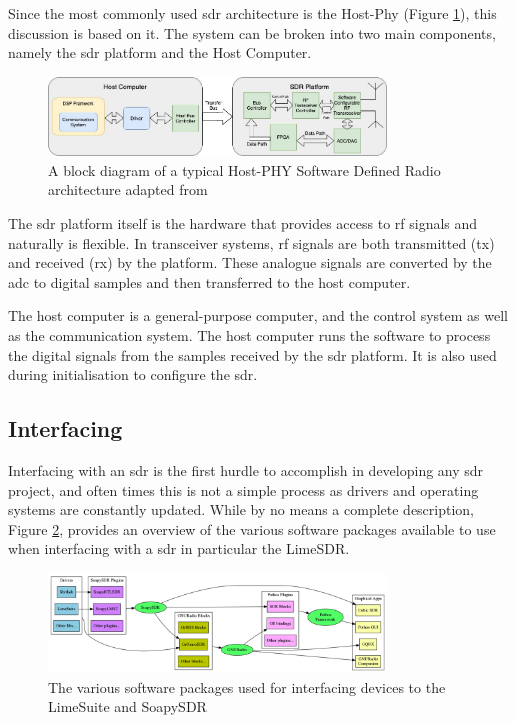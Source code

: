 \documentclass[class=report,11pt,crop=false]{standalone}
\begin{document}
Since the most commonly used \gls{sdr} architecture is the Host-Phy (Figure \ref{fig:hostphy}), this discussion is based on it. The system can be broken into two main components, namely the \gls{sdr} platform and the Host Computer. 

\begin{figure}[h]
    \centering
    \includegraphics[width=0.8\textwidth]{Images/diagrams/SDR.jpg}
    \caption{A block diagram of a typical Host-PHY Software Defined Radio architecture adapted from \cite{sdr-arch}}
    \label{fig:hostphy}
\end{figure}

The \gls{sdr} platform itself is the hardware that provides access to \gls{rf} signals and naturally is flexible. In transceiver systems, \gls{rf} signals are both transmitted (\gls{tx}) and received (\gls{rx}) by the platform. These analogue signals are converted by the \gls{adc} to digital samples and then transferred to the host computer. 

The host computer is a general-purpose computer, and the control system as well as the communication system. The host computer runs the software to process the digital signals from the samples received by the \gls{sdr} platform. It is also used during initialisation to configure the \gls{sdr}.

\subsection{Interfacing}
Interfacing with an \gls{sdr} is the first hurdle to accomplish in developing any \gls{sdr} project, and often times this is not a simple process as drivers and operating systems are constantly updated. While by no means a complete description, Figure \ref{fig:limeSDR-interfacing-soapy}, provides an overview of the various software packages available to use when interfacing with a \gls{sdr} in particular the LimeSDR. 
\begin{figure}[h]
    \centering
    \includegraphics[width=0.8\textwidth]{Images/diagrams/interfacing_LimeSDR.png}
    \caption{The various software packages used for interfacing devices to the LimeSuite and SoapySDR \cite{limesuite-soapy}}
    \label{fig:limeSDR-interfacing-soapy}
\end{figure}
\end{document}
